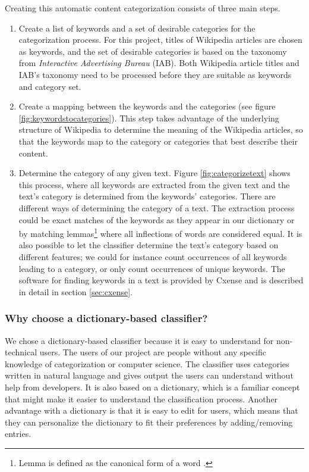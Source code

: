 Creating this automatic content categorization consists of three main steps. 
\begin{enumerate}
\item Create a list of keywords and a set of desirable categories for the categorization process. For this project, titles of Wikipedia articles are chosen as keywords, and the set of desirable categories is based on the taxonomy from  \emph{Interactive Advertising Bureau} (IAB). 
Both Wikipedia article titles and IAB's taxonomy need to be processed before they are suitable as keywords and category set. 
\item Create a mapping between the keywords and the categories (see figure \ref{fig:keywordstocategories}). This step takes advantage of the underlying structure of Wikipedia to determine the meaning of the Wikipedia articles, so that the keywords map to the category or categories that best describe their content.
\item Determine the category of any given text. Figure \ref{fig:categorizetext} shows this process, where all keywords are extracted from the given text and the text's category is determined from the keywords' categories. There are different ways of determining the category of a text. The extraction process could be exact matches of the keywords as they appear in our dictionary or by matching lemmas\footnote{Lemma is defined as the canonical form of a word \cite[][p. 30]{iirbook}.} where all inflections of words are considered equal. It is also possible to let the classifier determine the text's category based on different features; we could for instance count occurrences of all  keywords leading to a category, or only count occurrences of unique keywords. The software for finding keywords in a text is provided by Cxense and is described in detail in section \ref{sec:cxense}.
\end{enumerate}

\subsubsection{Why choose a dictionary-based classifier?}
We chose a dictionary-based classifier because it is easy to understand for non-technical users. The users of our project are people without any specific knowledge of categorization or computer science. The classifier uses categories written in natural language and gives output the users can understand without help from developers. It is also based on a dictionary, which is a familiar concept that might make it easier to understand the classification process. Another advantage with a dictionary is that it is easy to edit for users, which means that they can personalize the dictionary to fit their preferences by adding/removing entries. 

